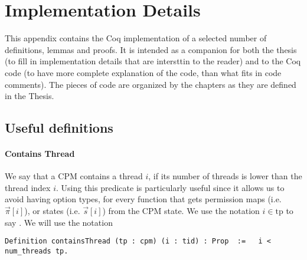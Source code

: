 \chapter{Implementation Details\label{ch:implementation}}

\lstset{numbers=left, stepnumber=1, firstnumber=last}
This appendix contains the Coq implementation of a selected number of definitions, lemmas and proofs. It is intended as a companion for both the thesis (to fill in implementation details that are intersttin to the reader) and to the Coq code (to have more complete explanation of the code, than what fits in code comments).  The pieces of code are organized by the chapters as they are defined in the Thesis.  

\section{Useful definitions}\label{sec:usefuldefs}
\subsubsection{Contains Thread}
We say that a CPM contains a thread $i$, if its number of threads is lower than the thread index $i$. Using this predicate is particularly useful since it allows us to avoid having option types, for every function that gets permission maps (i.e. $\vec{\pi}[i]$), or states (i.e. $\vec{s}[i]$) from the CPM state. We use the notation $i \in \text{tp}$ to say  . 
We will use the notation 
\begin{lstlisting}[firstnumber=1]
Definition containsThread (tp : cpm) (i : tid) : Prop  :=   i < num_threads tp.
\end{lstlisting}

